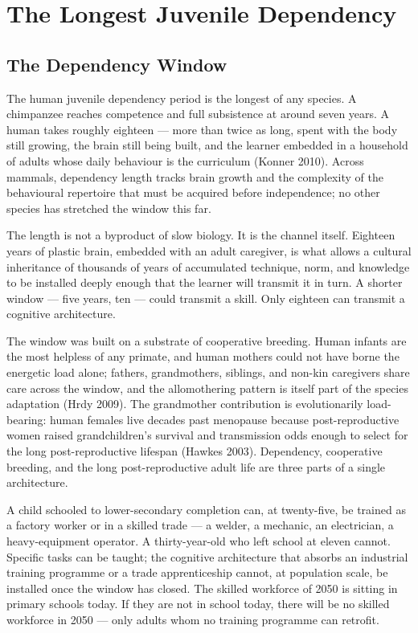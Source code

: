 \documentclass[12pt,letterpaper]{article}
\begin{document}
\section{The Longest Juvenile Dependency}\label{longest-juvenile-dependency}

\subsection{The Dependency Window}\label{the-dependency-window}

The human juvenile dependency period is the longest of any species.
A chimpanzee reaches competence and full subsistence at around seven
years. A human takes roughly eighteen --- more than twice as long,
spent with the body still growing, the brain still being built, and
the learner embedded in a household of adults whose daily behaviour
is the curriculum (Konner 2010). Across mammals, dependency length
tracks brain growth and the complexity of the behavioural repertoire
that must be acquired before independence; no other species has
stretched the window this far.

The length is not a byproduct of slow biology. It is the channel
itself. Eighteen years of plastic brain, embedded with an adult
caregiver, is what allows a cultural inheritance of thousands of
years of accumulated technique, norm, and knowledge to be installed
deeply enough that the learner will transmit it in turn. A shorter
window --- five years, ten --- could transmit a skill. Only eighteen
can transmit a cognitive architecture.

The window was built on a substrate of cooperative breeding. Human
infants are the most helpless of any primate, and human mothers could
not have borne the energetic load alone; fathers, grandmothers,
siblings, and non-kin caregivers share care across the window, and
the allomothering pattern is itself part of the species adaptation
(Hrdy 2009). The grandmother contribution is evolutionarily
load-bearing: human females live decades past menopause because
post-reproductive women raised grandchildren's survival and
transmission odds enough to select for the long post-reproductive
lifespan (Hawkes 2003). Dependency, cooperative breeding, and
the long post-reproductive adult life are three parts of a single
architecture.

A child schooled to lower-secondary completion can, at twenty-five,
be trained as a factory worker or in a skilled trade --- a welder,
a mechanic, an electrician, a heavy-equipment operator. A
thirty-year-old who left school at eleven cannot. Specific tasks
can be taught; the cognitive architecture that absorbs an
industrial training programme or a trade apprenticeship cannot,
at population scale, be installed once the window has closed. The
skilled workforce of 2050 is sitting in primary schools today.
If they are not in school today, there will be no skilled
workforce in 2050 --- only adults whom no training programme can
retrofit.
\end{document}

